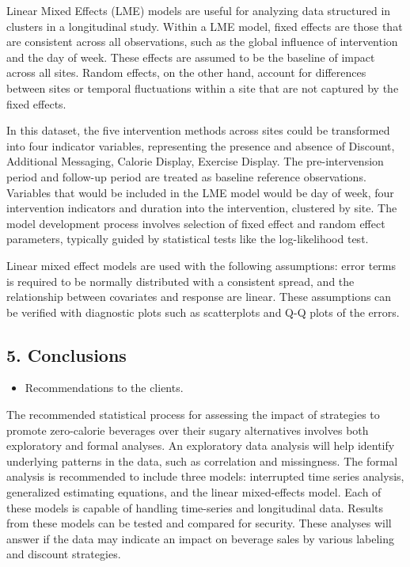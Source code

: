\documentclass[
]{article}
\providecommand{\tightlist}{%
  \setlength{\itemsep}{0pt}\setlength{\parskip}{0pt}}
\begin{document}
Linear Mixed Effects (LME) models are useful for analyzing data
structured in clusters in a longitudinal study. Within a LME model,
fixed effects are those that are consistent across all observations,
such as the global influence of intervention and the day of week. These
effects are assumed to be the baseline of impact across all sites.
Random effects, on the other hand, account for differences between sites
or temporal fluctuations within a site that are not captured by the
fixed effects.

In this dataset, the five intervention methods across sites could be
transformed into four indicator variables, representing the presence and
absence of Discount, Additional Messaging, Calorie Display, Exercise
Display. The pre-intervension period and follow-up period are treated as
baseline reference observations. Variables that would be included in the
LME model would be day of week, four intervention indicators and
duration into the intervention, clustered by site. The model development
process involves selection of fixed effect and random effect parameters,
typically guided by statistical tests like the log-likelihood test.

Linear mixed effect models are used with the following assumptions:
error terms is required to be normally distributed with a consistent
spread, and the relationship between covariates and response are linear.
These assumptions can be verified with diagnostic plots such as
scatterplots and Q-Q plots of the errors.

\hypertarget{conclusions}{%
\subsection{5. Conclusions}\label{conclusions}}

\begin{itemize}
\tightlist
\item
  Recommendations to the clients.
\end{itemize}

The recommended statistical process for assessing the impact of
strategies to promote zero-calorie beverages over their sugary
alternatives involves both exploratory and formal analyses. An
exploratory data analysis will help identify underlying patterns in the
data, such as correlation and missingness. The formal analysis is
recommended to include three models: interrupted time series analysis,
generalized estimating equations, and the linear mixed-effects model.
Each of these models is capable of handling time-series and longitudinal
data. Results from these models can be tested and compared for security.
These analyses will answer if the data may indicate an impact on
beverage sales by various labeling and discount strategies.
\end{document}
